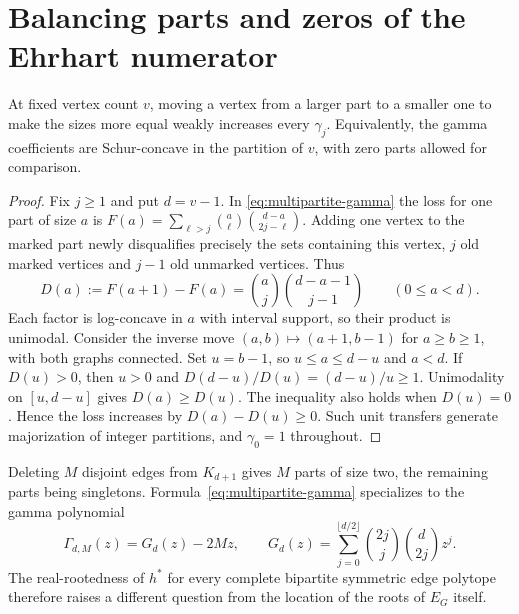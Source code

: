 \section{Balancing parts and zeros of the Ehrhart numerator}
\label{sec:numerator}

\begin{proposition}\label{prop:schur}
At fixed vertex count $v$, moving a vertex from a larger part to a
smaller one to make the sizes more equal weakly increases every
$\gamma_j$. Equivalently, the gamma coefficients are Schur-concave in
the partition of $v$, with zero parts allowed for comparison.
\end{proposition}
\begin{proof}
Fix $j\ge1$ and put $d=v-1$. In \eqref{eq:multipartite-gamma} the loss
for one part of size $a$ is
$F(a)=\sum_{\ell>j}\binom a\ell\binom{d-a}{2j-\ell}$.
Adding one vertex to the marked part newly disqualifies precisely the
sets containing this vertex, $j$ old marked vertices and $j-1$ old
unmarked vertices. Thus
\[
 D(a):=F(a+1)-F(a)=\binom a j\binom{d-a-1}{j-1}
 \qquad(0\le a<d).
\]
Each factor is log-concave in $a$ with interval support, so their
product is unimodal. Consider the inverse move $(a,b)\mapsto(a+1,b-1)$
for $a\ge b\ge1$, with both graphs connected. Set $u=b-1$, so
$u\le a\le d-u$ and $a<d$. If $D(u)>0$, then $u>0$ and
$D(d-u)/D(u)=(d-u)/u\ge1$. Unimodality on $[u,d-u]$ gives
$D(a)\ge D(u)$. The inequality also holds when $D(u)=0$. Hence the
loss increases by $D(a)-D(u)\ge0$. Such unit transfers generate
majorization of integer partitions, and $\gamma_0=1$ throughout.
\end{proof}

Deleting $M$ disjoint edges from $K_{d+1}$ gives $M$ parts of size two,
the remaining parts being singletons. Formula~\eqref{eq:multipartite-gamma}
specializes to the gamma polynomial
\begin{equation}\label{eq:gamma-match}
 \Gamma_{d,M}(z)=G_d(z)-2Mz,\qquad
 G_d(z)=\sum_{j=0}^{\lfloor d/2\rfloor}\binom{2j}{j}\binom d{2j}z^j .
\end{equation}
The real-rootedness of $h^*$ for every complete bipartite symmetric edge
polytope~\cite[Thm.~4.8]{hjm} therefore raises a different question from
the location of the roots of $E_G$ itself.

